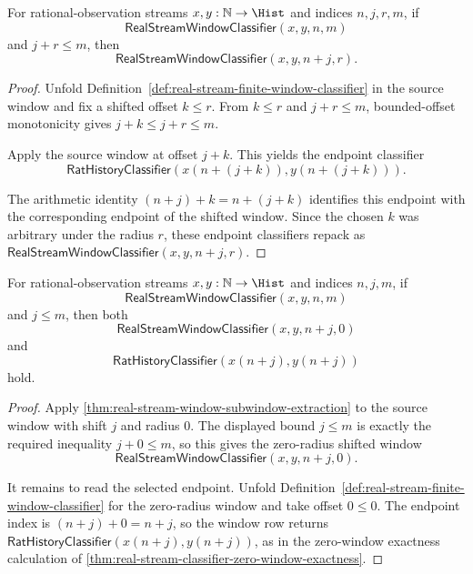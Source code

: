 \begin{theorem}
\label{thm:real-stream-window-subwindow-extraction}
For rational-observation streams $x,y:\mathbb{N}\to\Hist$ and indices
$n,j,r,m$, if
$$
\mathsf{RealStreamWindowClassifier}(x,y,n,m)
$$
and $j+r\le m$, then
$$
\mathsf{RealStreamWindowClassifier}(x,y,n+j,r).
$$
\end{theorem}
\begin{proof}
Unfold Definition~\ref{def:real-stream-finite-window-classifier} in the source
window and fix a shifted offset $k\le r$. From $k\le r$ and $j+r\le m$,
bounded-offset monotonicity gives $j+k\le j+r\le m$.

Apply the source window at offset $j+k$. This yields the endpoint classifier
$$
\mathsf{RatHistoryClassifier}(x(n+(j+k)),y(n+(j+k))).
$$

The arithmetic identity $(n+j)+k=n+(j+k)$ identifies this endpoint with the
corresponding endpoint of the shifted window. Since the chosen $k$ was
arbitrary under the radius $r$, these endpoint classifiers repack as
$\mathsf{RealStreamWindowClassifier}(x,y,n+j,r)$.
\end{proof}

\begin{theorem}
\label{thm:real-stream-window-selected-zero-subwindow-package}
For rational-observation streams $x,y:\mathbb{N}\to\Hist$ and indices $n,j,m$,
if
$$
\mathsf{RealStreamWindowClassifier}(x,y,n,m)
$$
and $j\le m$, then both
$$
\mathsf{RealStreamWindowClassifier}(x,y,n+j,0)
$$
and
$$
\mathsf{RatHistoryClassifier}(x(n+j),y(n+j))
$$
hold.
\end{theorem}
\begin{proof}
Apply \autoref{thm:real-stream-window-subwindow-extraction} to the source
window with shift $j$ and radius $0$. The displayed bound $j\le m$ is exactly
the required inequality $j+0\le m$, so this gives the zero-radius shifted
window
$$
\mathsf{RealStreamWindowClassifier}(x,y,n+j,0).
$$

It remains to read the selected endpoint. Unfold
Definition~\ref{def:real-stream-finite-window-classifier} for the zero-radius
window and take offset $0\le 0$. The endpoint index is
$(n+j)+0=n+j$, so the window row returns
$\mathsf{RatHistoryClassifier}(x(n+j),y(n+j))$, as in the zero-window
exactness calculation of
\autoref{thm:real-stream-classifier-zero-window-exactness}.
\end{proof}

